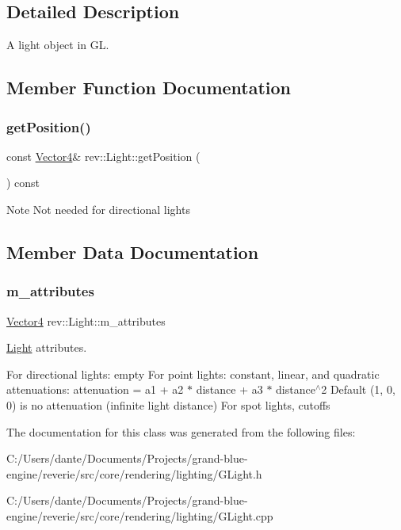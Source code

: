 \subsection{Detailed Description}
A light object in GL. 

\subsection{Member Function Documentation}
\mbox{\label{classrev_1_1_light_a1f68077994136c1c7496955a51e56cc0}} 
\subsubsection{\texorpdfstring{getPosition()}{getPosition()}}
{\footnotesize\ttfamily const \mbox{\hyperlink{classrev_1_1_vector}{Vector4}}\& rev\+::\+Light\+::get\+Position (\begin{DoxyParamCaption}{ }\end{DoxyParamCaption}) const\hspace{0.3cm}{\ttfamily [inline]}}

\begin{DoxyNote}{Note}
Not needed for directional lights 
\end{DoxyNote}


\subsection{Member Data Documentation}
\mbox{\label{classrev_1_1_light_acb7615661d2b2d0bc67edb759c30cf59}} 
\subsubsection{\texorpdfstring{m\_attributes}{m\_attributes}}
{\footnotesize\ttfamily \mbox{\hyperlink{classrev_1_1_vector}{Vector4}} rev\+::\+Light\+::m\+\_\+attributes\hspace{0.3cm}{\ttfamily [protected]}}



\mbox{\hyperlink{classrev_1_1_light}{Light}} attributes. 

For directional lights\+: empty For point lights\+: constant, linear, and quadratic attenuations\+: attenuation = a1 + a2 $\ast$ distance + a3 $\ast$ distance$^\wedge$2 Default (1, 0, 0) is no attenuation (infinite light distance) For spot lights, cutoffs 

The documentation for this class was generated from the following files\+:\begin{DoxyCompactItemize}
\item 
C\+:/\+Users/dante/\+Documents/\+Projects/grand-\/blue-\/engine/reverie/src/core/rendering/lighting/G\+Light.\+h\item 
C\+:/\+Users/dante/\+Documents/\+Projects/grand-\/blue-\/engine/reverie/src/core/rendering/lighting/G\+Light.\+cpp\end{DoxyCompactItemize}
